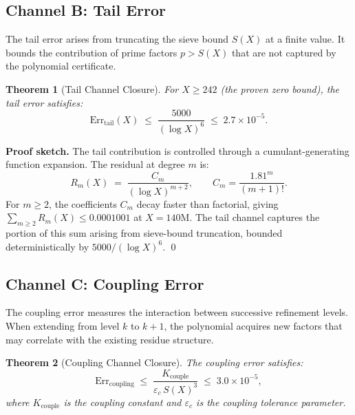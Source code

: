 \documentclass[11pt]{article}
\newtheorem{theorem}{Theorem}
\begin{document}
\subsection{Channel B: Tail Error}

The tail error arises from truncating the sieve bound $S(X)$ at a finite value.
It bounds the contribution of prime factors $p > S(X)$ that are not captured
by the polynomial certificate.

\begin{theorem}[Tail Channel Closure]
\label{thm:tail}
For $X \ge 242$ (the proven zero bound), the tail error satisfies:
\begin{equation}
\mathrm{Err}_\mathrm{tail}(X) \;\le\; \frac{5000}{(\log X)^6}
\;\le\; 2.7 \times 10^{-5}.
\end{equation}
\end{theorem}

\noindent\textbf{Proof sketch.} The tail contribution is controlled through a
cumulant-generating function expansion. The residual at degree $m$ is:
\begin{equation}
R_m(X) \;=\; \frac{C_m}{(\log X)^{m+2}}, \qquad
C_m = \frac{1.81^m}{(m+1)!}.
\end{equation}
\noindent For $m \ge 2$, the coefficients $C_m$ decay faster than factorial,
giving $\sum_{m\ge 2} R_m(X) \le 0.0001001$ at $X = 140\mathrm{M}$. The tail
channel captures the portion of this sum arising from sieve-bound truncation,
bounded deterministically by $5000/(\log X)^6$. \qed

\subsection{Channel C: Coupling Error}

The coupling error measures the interaction between successive refinement levels.
When extending from level $k$ to $k+1$, the polynomial acquires new factors that
may correlate with the existing residue structure.

\begin{theorem}[Coupling Channel Closure]
\label{thm:coupling}
The coupling error satisfies:
\begin{equation}
\mathrm{Err}_\mathrm{coupling} \;\le\;
\frac{K_\mathrm{couple}}{\varepsilon_c\, S(X)^3}
\;\le\; 3.0 \times 10^{-5},
\end{equation}
\noindent where $K_\mathrm{couple}$ is the coupling constant and
$\varepsilon_c$ is the coupling tolerance parameter.
\end{theorem}
\end{document}
